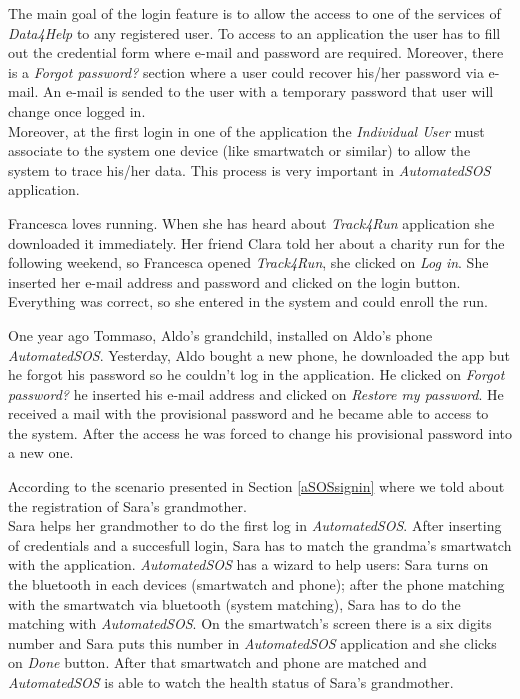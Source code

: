 The main goal of the login feature is to allow the access to one of the services of \textit{Data4Help} to any registered user. To access to an application the user has to fill out the credential form where e-mail and password are required. Moreover, there is a \textit{Forgot password?} section where a user could recover his/her password via e-mail. An e-mail is sended to the user with a temporary password that user will change once logged in.\\
Moreover, at the first login in one of the application the \textit{Individual User} must associate to the system one device (like smartwatch or similar) to allow the system to trace his/her data. This process is very important in \textit{AutomatedSOS} application.

Francesca loves running. When she has heard about \textit{Track4Run} application she downloaded it immediately. Her friend Clara told her about a charity run for the following weekend, so Francesca opened \textit{Track4Run}, she clicked on \textit{Log in}. She inserted her e-mail address and password and clicked on the login button. Everything was correct, so she entered in the system and could enroll the run.

One year ago Tommaso, Aldo's grandchild, installed on Aldo’s phone \textit{AutomatedSOS}. Yesterday, Aldo bought a new phone, he downloaded the app but he forgot his password so he couldn’t log in the application. He clicked on \textit{Forgot password?} he inserted his e-mail address and clicked on \textit{Restore my password}. He received a mail with the provisional password and he became able to access to the system. After the access he was forced to change his provisional password into a new one.

According to the scenario presented in Section \ref{aSOSsignin} where we told about the registration of Sara's grandmother.\\
Sara helps her grandmother to do the first log in \textit{AutomatedSOS}. After inserting of credentials and a succesfull login, Sara has to match the grandma's smartwatch with the application. \textit{AutomatedSOS} has a wizard to help users: Sara turns on the bluetooth in each devices (smartwatch and phone); after the phone matching with the smartwatch via bluetooth (system matching), Sara has to do the matching with \textit{AutomatedSOS}. On the smartwatch's screen there is a six digits number and Sara puts this number in \textit{AutomatedSOS} application and she clicks on \textit{Done} button. After that smartwatch and phone are matched and \textit{AutomatedSOS} is able to watch the health status of Sara's grandmother.


